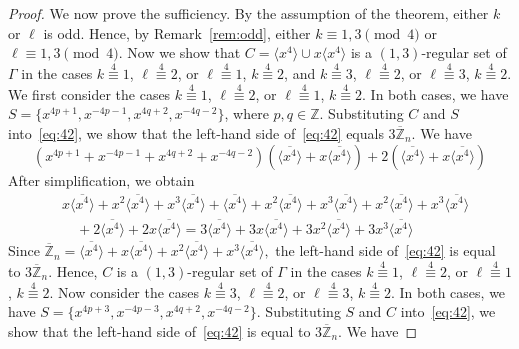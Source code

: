 \documentclass[12pt]{article}
\begin{document}
\begin{proof}
We now prove the sufficiency. By the assumption of the theorem, either $k$ or $\ell$ is odd. Hence, by Remark~\ref{rem:odd}, either $k\equiv1,3\pmod{4}$ or $\ell\equiv1,3\pmod{4}$. Now we show that
$C=\langle x^{4}\rangle \cup x\langle x^{4}\rangle$
is a $(1,3)$-regular set of $\Gamma$ in the cases
$k\stackrel{4}{\equiv}1$, $\ell\stackrel{4}{\equiv}2$,
or $\ell\stackrel{4}{\equiv}1$, $k\stackrel{4}{\equiv}2$,
and
$k\stackrel{4}{\equiv}3$, $\ell\stackrel{4}{\equiv}2$,
or $\ell\stackrel{4}{\equiv}3$, $k\stackrel{4}{\equiv}2$.
We first consider the cases
$k\stackrel{4}{\equiv}1$, $\ell\stackrel{4}{\equiv}2$,
or $\ell\stackrel{4}{\equiv}1$, $k\stackrel{4}{\equiv}2$.
In both cases, we have
$S=\{x^{4p+1},x^{-4p-1},x^{4q+2},x^{-4q-2}\}$, where \(p,q\in\mathbb{Z}\). Substituting $C$ and $S$ into~\eqref{eq:42}, we show that the left-hand side of~\eqref{eq:42} equals $3\overline{\mathbb{Z}}_{n}$.
We have
\[
\left(x^{4p+1}+x^{-4p-1}+x^{4q+2}+x^{-4q-2}\right)
\left(\overline{\langle x^{4}\rangle}+x\overline{\langle x^{4}\rangle}\right)
+2\left(\overline{\langle x^{4}\rangle}+x\overline{\langle x^{4}\rangle}\right)
\]
After simplification, we obtain
\[
\begin{aligned}
	&x\overline{\langle x^{4}\rangle}
	+x^{2}\overline{\langle x^{4}\rangle}
	+x^{3}\overline{\langle x^{4}\rangle}
	+\overline{\langle x^{4}\rangle}
	+x^{2}\overline{\langle x^{4}\rangle}+x^{3}\overline{\langle x^{4}\rangle}+x^{2}\overline{\langle x^{4}\rangle}
	+x^{3}\overline{\langle x^{4}\rangle} \\
	&\quad
	+2\overline{\langle x^{4}\rangle}
	+2x\overline{\langle x^{4}\rangle}
	=3\overline{\langle x^{4}\rangle}
	+3x\overline{\langle x^{4}\rangle}
	+3x^{2}\overline{\langle x^{4}\rangle}
	+3x^{3}\overline{\langle x^{4}\rangle}
\end{aligned}
\]
Since
$
\overline{\mathbb{Z}}_{n}
=
\overline{\langle x^{4}\rangle}
+x\overline{\langle x^{4}\rangle}
+x^{2}\overline{\langle x^{4}\rangle}
+x^{3}\overline{\langle x^{4}\rangle},
$
the left-hand side of~\eqref{eq:42} is equal to
$3\overline{\mathbb{Z}}_{n}$.
Hence, $C$ is a $(1,3)$-regular set of $\Gamma$ in the cases $k\stackrel{4}{\equiv}1$, $\ell\stackrel{4}{\equiv}2$,
or $\ell\stackrel{4}{\equiv}1$, $k\stackrel{4}{\equiv}2$.
Now consider the cases $k\stackrel{4}{\equiv}3$, $\ell\stackrel{4}{\equiv}2$, or $\ell\stackrel{4}{\equiv}3$, $k\stackrel{4}{\equiv}2$. In both cases, we have $S=\{x^{4p+3},x^{-4p-3},x^{4q+2},x^{-4q-2}\}$. Substituting $S$ and $C$ into~\eqref{eq:42}, we show that the left-hand side of~\eqref{eq:42} is equal to $3\overline{\mathbb{Z}}_{n}$. We have

\end{proof}
\end{document}
